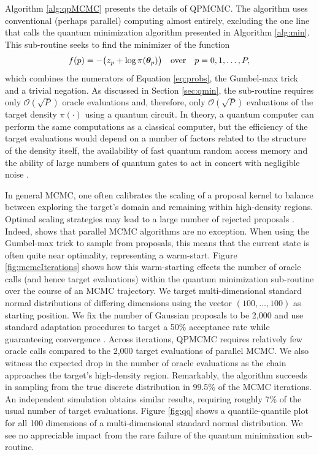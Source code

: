 \documentclass[12pt]{article} %
\begin{document}
Algorithm \ref{alg:qpMCMC} presents the details of QPMCMC.  The algorithm uses conventional (perhaps parallel) computing almost entirely, excluding the one line that calls the quantum minimization algorithm presented in Algorithm \ref{alg:min}. 
This sub-routine seeks to find the minimizer of the function
\begin{align*}
f(p)= -\big(z_{p}+ \log\pi(\boldsymbol{\theta}_{p}) \big) \quad \mbox{over} \quad p=0,1,\dots, P,
\end{align*} 
which combines the numerators of Equation \eqref{eq:probs}, the Gumbel-max trick and a trivial negation.  As discussed in Section \ref{sec:qmin}, the sub-routine requires only $\mathcal{O}(\sqrt{P})$ oracle evaluations and, therefore, only $\mathcal{O}(\sqrt{P})$ evaluations of the target density $\pi(\cdot)$ using a quantum circuit.  In theory, a quantum computer can perform the same computations as a classical computer, but the efficiency of the target evaluations would depend on a number of factors related to the structure of the density itself, the availability of fast quantum random access memory \citep{giovannetti2008quantum} and the ability of large numbers of quantum gates to act in concert with negligible noise \citep{kielpinski2002architecture,erhard2019characterizing}.

In general MCMC, one often calibrates the scaling of a proposal kernel to balance between exploring the target's domain and remaining within high-density regions.  Optimal scaling strategies may lead to a large number of rejected proposals \citep{roberts2001optimal}.  Indeed, \citet{holbrook2021generating} shows that parallel MCMC algorithms are no exception. When using the Gumbel-max trick to sample from proposals, this means that the current state is often quite near optimality, representing a warm-start.  Figure \ref{fig:mcmcIterations} shows how this warm-starting effects the number of oracle calls (and hence target evaluations) within the quantum minimization sub-routine over the course of an MCMC trajectory.  We target multi-dimensional standard normal distributions of differing dimensions using the vector $(100,\dots,100)$ as starting position. We fix the number of Gaussian proposals to be 2,000 and use standard adaptation procedures to target a 50\% acceptance rate while guaranteeing convergence \citep{rosenthal2011optimal}. Across iterations, QPMCMC requires relatively few oracle calls compared to the 2,000 target evaluations of parallel MCMC. We also witness the expected drop in the number of oracle evaluations as the chain approaches the target's high-density region. Remarkably, the algorithm succeeds in sampling from the true discrete distribution in 99.5\% of the MCMC iterations. An independent simulation obtains similar results, requiring roughly 7\% of the usual number of target evaluations. Figure \ref{fig:qq} shows a quantile-quantile plot for all 100 dimensions of a multi-dimensional standard normal distribution. We see no appreciable impact from the rare failure of the quantum minimization sub-routine.
\end{document}
